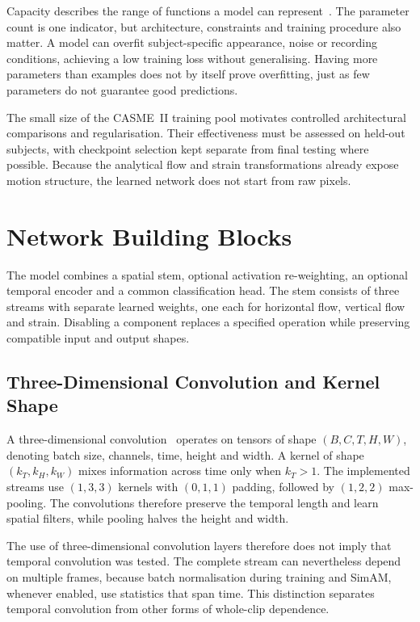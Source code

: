 Capacity describes the range of functions a model can represent~\cite{goodfellow2016}. The parameter count is one indicator, but architecture, constraints and training procedure also matter. A model can overfit subject-specific appearance, noise or recording conditions, achieving a low training loss without generalising. Having more parameters than examples does not by itself prove overfitting, just as few parameters do not guarantee good predictions.

The small size of the CASME~II training pool motivates controlled architectural comparisons and regularisation. Their effectiveness must be assessed on held-out subjects, with checkpoint selection kept separate from final testing where possible. Because the analytical flow and strain transformations already expose motion structure, the learned network does not start from raw pixels.


\section{Network Building Blocks}
\label{sec:building-blocks}

The model combines a spatial stem, optional activation re-weighting, an optional temporal encoder and a common classification head. The stem consists of three streams with separate learned weights, one each for horizontal flow, vertical flow and strain. Disabling a component replaces a specified operation while preserving compatible input and output shapes.

\subsection{Three-Dimensional Convolution and Kernel Shape}
\label{sec:conv3d}

A three-dimensional convolution~\cite{ji2013,tran2015} operates on tensors of shape $(B,C,T,H,W)$, denoting batch size, channels, time, height and width. A kernel of shape $(k_T,k_H,k_W)$ mixes information across time only when $k_T>1$. The implemented streams use $(1,3,3)$ kernels with $(0,1,1)$ padding, followed by $(1,2,2)$ max-pooling. The convolutions therefore preserve the temporal length and learn spatial filters, while pooling halves the height and width.

The use of three-dimensional convolution layers therefore does not imply that temporal convolution was tested. The complete stream can nevertheless depend on multiple frames, because batch normalisation during training and SimAM, whenever enabled, use statistics that span time. This distinction separates temporal convolution from other forms of whole-clip dependence.

